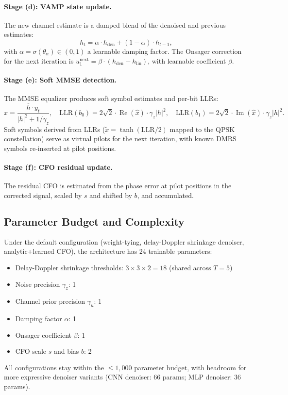 \documentclass{article}
\begin{document}
\paragraph{Stage (d): VAMP state update.}
The new channel estimate is a damped blend of the denoised and previous estimates:
\begin{equation}
h_t = \alpha \cdot h_{\mathrm{den}} + (1 - \alpha) \cdot h_{t-1},
\end{equation}
with $\alpha = \sigma(\theta_\alpha) \in (0, 1)$ a learnable damping factor. The Onsager correction for the next iteration is $u_1^{\mathrm{next}} = \beta \cdot (h_{\mathrm{den}} - h_{\mathrm{lin}})$, with learnable coefficient $\beta$.

\paragraph{Stage (e): Soft MMSE detection.}
The MMSE equalizer produces soft symbol estimates and per-bit LLRs:
\begin{equation}
\hat{x} = \frac{\overline{h} \cdot y_t}{|h|^2 + 1/\gamma_z}, \quad
\mathrm{LLR}(b_0) = 2\sqrt{2} \cdot \operatorname{Re}(\hat{x}) \cdot \gamma_z |h|^2, \quad
\mathrm{LLR}(b_1) = 2\sqrt{2} \cdot \operatorname{Im}(\hat{x}) \cdot \gamma_z |h|^2.
\end{equation}
Soft symbols derived from LLRs ($\tilde{x} = \tanh(\mathrm{LLR}/2)$ mapped to the QPSK constellation) serve as virtual pilots for the next iteration, with known DMRS symbols re-inserted at pilot positions.

\paragraph{Stage (f): CFO residual update.}
The residual CFO is estimated from the phase error at pilot positions in the corrected signal, scaled by $s$ and shifted by $b$, and accumulated.

\subsection{Parameter Budget and Complexity}
\label{sec:params}

Under the default configuration (weight-tying, delay-Doppler shrinkage denoiser, analytic+learned CFO), the architecture has 24 trainable parameters:
\begin{itemize}
  \item Delay-Doppler shrinkage thresholds: $3 \times 3 \times 2 = 18$ (shared across $T=5$)
  \item Noise precision $\gamma_z$: 1
  \item Channel prior precision $\gamma_h$: 1
  \item Damping factor $\alpha$: 1
  \item Onsager coefficient $\beta$: 1
  \item CFO scale $s$ and bias $b$: 2
\end{itemize}
All configurations stay within the $\leq 1{,}000$ parameter budget, with headroom for more expressive denoiser variants (CNN denoiser: 66 params; MLP denoiser: 36 params).
\end{document}
